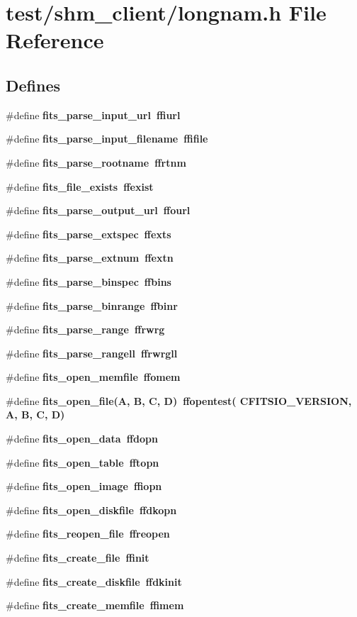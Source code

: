 \section{test/shm\_\-client/longnam.h File Reference}
\label{test_2shm__client_2longnam_8h}
\subsection*{Defines}
\begin{CompactItemize}
\item 
\#define \bf{fits\_\-parse\_\-input\_\-url}~ffiurl
\item 
\#define \bf{fits\_\-parse\_\-input\_\-filename}~ffifile
\item 
\#define \bf{fits\_\-parse\_\-rootname}~ffrtnm
\item 
\#define \bf{fits\_\-file\_\-exists}~ffexist
\item 
\#define \bf{fits\_\-parse\_\-output\_\-url}~ffourl
\item 
\#define \bf{fits\_\-parse\_\-extspec}~ffexts
\item 
\#define \bf{fits\_\-parse\_\-extnum}~ffextn
\item 
\#define \bf{fits\_\-parse\_\-binspec}~ffbins
\item 
\#define \bf{fits\_\-parse\_\-binrange}~ffbinr
\item 
\#define \bf{fits\_\-parse\_\-range}~ffrwrg
\item 
\#define \bf{fits\_\-parse\_\-rangell}~ffrwrgll
\item 
\#define \bf{fits\_\-open\_\-memfile}~ffomem
\item 
\#define \bf{fits\_\-open\_\-file}(A, B, C, D)~ffopentest( CFITSIO\_\-VERSION, A, B, C, D)
\item 
\#define \bf{fits\_\-open\_\-data}~ffdopn
\item 
\#define \bf{fits\_\-open\_\-table}~fftopn
\item 
\#define \bf{fits\_\-open\_\-image}~ffiopn
\item 
\#define \bf{fits\_\-open\_\-diskfile}~ffdkopn
\item 
\#define \bf{fits\_\-reopen\_\-file}~ffreopen
\item 
\#define \bf{fits\_\-create\_\-file}~ffinit
\item 
\#define \bf{fits\_\-create\_\-diskfile}~ffdkinit
\item 
\#define \bf{fits\_\-create\_\-memfile}~ffimem
\item 

\end{CompactItemize}
